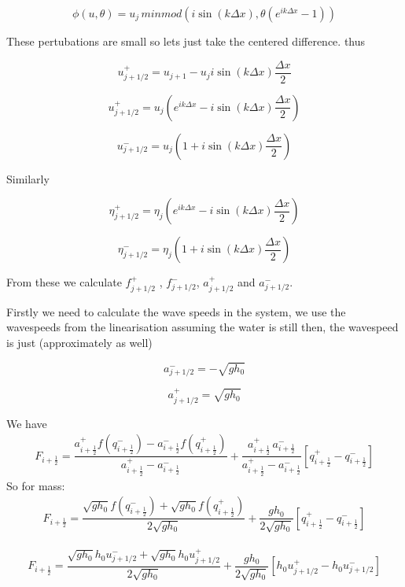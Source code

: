 \documentclass[12pt]{article}
\begin{document}
\[\phi\left(u,\theta\right) = u_j \, minmod \left( i\sin\left(k \Delta x\right)  , \theta \left( e^{ik\Delta x} - 1\right) \right) \]

These pertubations are small so lets just take the centered difference. thus 

\[u^+_{j + 1/2} = u_{j+1} - u_j i\sin\left(k \Delta x\right) \frac{\Delta x}{2} \]

\[u^+_{j + 1/2} = u_j\left(e^{ik\Delta x} -  i\sin\left(k \Delta x\right) \frac{\Delta x}{2} \right) \]

\[u^-_{j + 1/2} =  u_j\left(1 + i\sin\left(k \Delta x\right) \frac{\Delta x}{2} \right) \]

Similarly 

\[\eta^+_{j + 1/2} = \eta_j\left(e^{ik\Delta x} -  i\sin\left(k \Delta x\right) \frac{\Delta x}{2} \right) \]

\[\eta^-_{j + 1/2} =  \eta_j\left(1 + i\sin\left(k \Delta x\right) \frac{\Delta x}{2} \right) \]

From these  we calculate $f^+_{j + 1/2}$ , $f^-_{j + 1/2}$, $a_{j + 1/2}^+$ and $a_{j + 1/2}^{-}$. 

Firstly we need to calculate the wave speeds in the system, we use the wavespeeds from the linearisation assuming the water is still then, the wavespeed is just (approximately as well)

\[a^-_{j + 1/2} = - \sqrt{g h_0} \]

\[a^+_{j + 1/2} =  \sqrt{g h_0} \]

We have 
	\begin{gather}\label{eq:HLL_flux}
	F_{i+\frac{1}{2}} = \dfrac{a^+_{i+\frac{1}{2}} f\left(q^-_{i+\frac{1}{2}}\right) - a^-_{i+\frac{1}{2}} f\left(q^+_{i+\frac{1}{2}}\right)}{a^+_{i+\frac{1}{2}} - a^-_{i+\frac{1}{2}}}  + \dfrac{a^+_{i+\frac{1}{2}} \, a^-_{i+\frac{1}{2}}}{a^+_{i+\frac{1}{2}} - a^-_{i+\frac{1}{2}}} \left [ q^+_{i+\frac{1}{2}} - q^-_{i+\frac{1}{2}} \right ]
	\end{gather}
So for mass:
\begin{gather}
F_{i+\frac{1}{2}} = \dfrac{\sqrt{g h_0} f\left(q^-_{i+\frac{1}{2}}\right) + \sqrt{g h_0} f\left(q^+_{i+\frac{1}{2}}\right)}{2\sqrt{g h_0}}  + \dfrac{g h_0}{2\sqrt{g h_0}} \left [ q^+_{i+\frac{1}{2}} - q^-_{i+\frac{1}{2}} \right ]
\end{gather}

\begin{gather}
F_{i+\frac{1}{2}} = \dfrac{\sqrt{g h_0} h_0 u^-_{j + 1/2} + \sqrt{g h_0}  h_0 u^+_{j + 1/2}}{2\sqrt{g h_0}}  + \dfrac{g h_0}{2\sqrt{g h_0}} \left [  h_0 u^+_{j + 1/2} -  h_0 u^-_{j + 1/2} \right ]
\end{gather}
\end{document}
